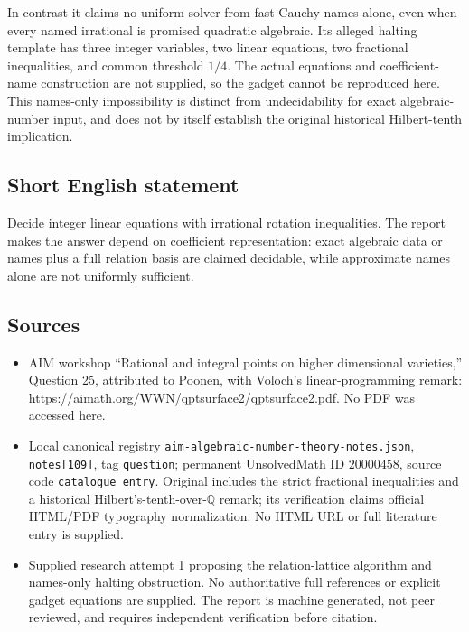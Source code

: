 \documentclass[11pt]{article}
\newcommand{\Q}{\mathbb{Q}}
\begin{document}
In contrast it claims no uniform solver from fast Cauchy names alone, even when every named irrational is promised quadratic algebraic. Its alleged halting template has three integer variables, two linear equations, two fractional inequalities, and common threshold \(1/4\). The actual equations and coefficient-name construction are not supplied, so the gadget cannot be reproduced here. This names-only impossibility is distinct from undecidability for exact algebraic-number input, and does not by itself establish the original historical Hilbert-tenth implication.
\subsection{Short English statement}
Decide integer linear equations with irrational rotation inequalities. The report makes the answer depend on coefficient representation: exact algebraic data or names plus a full relation basis are claimed decidable, while approximate names alone are not uniformly sufficient.
\subsection{Sources}
\begin{itemize}
\item AIM workshop ``Rational and integral points on higher dimensional varieties,'' Question 25, attributed to Poonen, with Voloch's linear-programming remark: \url{https://aimath.org/WWN/qptsurface2/qptsurface2.pdf}. No PDF was accessed here.
\item Local canonical registry \texttt{aim-algebraic-number-theory-notes.json}, \texttt{notes[109]}, tag \texttt{question}; permanent UnsolvedMath ID \(20000458\), source code \texttt{catalogue entry}. Original includes the strict fractional inequalities and a historical Hilbert's-tenth-over-\(\Q\) remark; its verification claims official HTML/PDF typography normalization. No HTML URL or full literature entry is supplied.
\item Supplied research attempt 1 proposing the relation-lattice algorithm and names-only halting obstruction. No authoritative full references or explicit gadget equations are supplied. The report is machine generated, not peer reviewed, and requires independent verification before citation.
\end{itemize}
\end{document}
